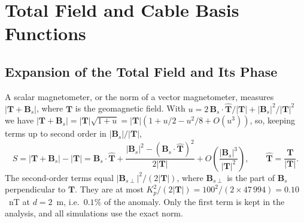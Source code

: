 \section{Total Field and Cable Basis Functions}\label{app:geometry}

\subsection{Expansion of the Total Field and Its Phase}\label{app:total_field_expansion}

A scalar magnetometer, or the norm of a vector magnetometer, measures $|\mathbf{T} + \mathbf{B}_s|$, where $\mathbf{T}$ is the geomagnetic field. With $u = 2\,\mathbf{B}_s\cdot\hat{\mathbf{T}}/|\mathbf{T}| + |\mathbf{B}_s|^{2}/|\mathbf{T}|^{2}$ we have $|\mathbf{T} + \mathbf{B}_s| = |\mathbf{T}|\sqrt{1+u} = |\mathbf{T}|(1 + u/2 - u^{2}/8 + O(u^{3}))$, so, keeping terms up to second order in $|\mathbf{B}_s|/|\mathbf{T}|$,
\begin{equation}
    S = |\mathbf{T} + \mathbf{B}_s| - |\mathbf{T}|
    = \mathbf{B}_s\cdot\hat{\mathbf{T}}
    + \frac{|\mathbf{B}_s|^{2} - (\mathbf{B}_s\cdot\hat{\mathbf{T}})^{2}}{2|\mathbf{T}|}
    + O\!\left(\frac{|\mathbf{B}_s|^{3}}{|\mathbf{T}|^{2}}\right),
    \qquad \hat{\mathbf{T}} = \frac{\mathbf{T}}{|\mathbf{T}|}.
    \label{eq:app_S_expansion}
\end{equation}
The second-order terms equal $|\mathbf{B}_{s\perp}|^{2}/(2|\mathbf{T}|)$, where $\mathbf{B}_{s\perp}$ is the part of $\mathbf{B}_s$ perpendicular to $\mathbf{T}$. They are at most $K_p^{2}/(2|\mathbf{T}|) = 100^{2}/(2 \times 47\,994) = 0.10$~nT at $d = 2$~m, i.e.\ $0.1\%$ of the anomaly. Only the first term is kept in the analysis, and all simulations use the exact norm.

